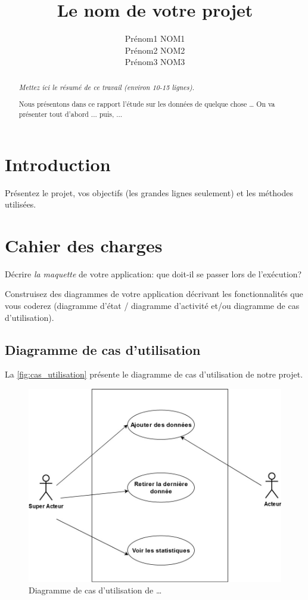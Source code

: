 \documentclass[11pt,a4paper]{article}
\title{Le nom de votre projet}
\author{Prénom1 NOM1\\Prénom2 NOM2\\Prénom3 NOM3}
\begin{document}


\begin{abstract}
  \emph{Mettez ici le résumé de ce travail (environ 10-15 lignes).}

  Nous présentons dans ce rapport l'étude sur les données de quelque chose \dots
  On va présenter tout d'abord ... puis, ...
\end{abstract}


\section{Introduction}

Présentez le projet, vos objectifs (les grandes lignes seulement) et les méthodes utilisées.


\section{Cahier des charges}

Décrire \emph{la maquette} de votre application: que doit-il se passer lors de l'exécution?

Construisez des diagrammes de votre application décrivant les fonctionnalités que vous coderez (diagramme d'état / diagramme d'activité et/ou diagramme de cas d'utilisation).

\subsection{Diagramme de cas d'utilisation}

La \autoref{fig:cas_utilisation} présente le diagramme de cas d'utilisation de notre projet.

\begin{figure}[tb]
  \centering
  \includegraphics[width=0.9\linewidth]{diagramme_cas_utilisation}
  \caption{Diagramme de cas d'utilisation de \dots}
  \label{fig:cas_utilisation}
\end{figure}
\end{document}
